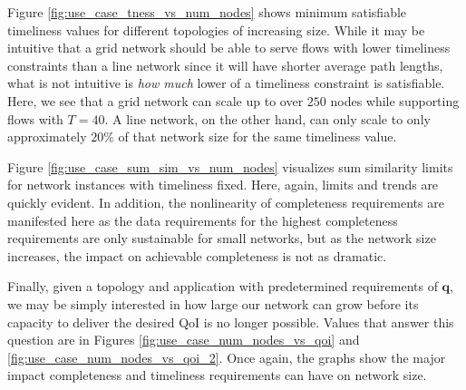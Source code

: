 Figure \ref{fig:use_case_tness_vs_num_nodes} shows minimum satisfiable timeliness values for different topologies of increasing size.  While it may be intuitive that a grid network should be able to serve flows with lower timeliness constraints than a line network since it will have shorter average path lengths, what is not intuitive is \emph{how much} lower of a timeliness constraint is satisfiable.  Here, we see that a grid network can scale up to over $250$ nodes while supporting flows with $T = 40$.  A line network, on the other hand, can only scale to only approximately $20\%$ of that network size for the same timeliness value.  %

Figure \ref{fig:use_case_sum_sim_vs_num_nodes} visualizes sum similarity limits for network instances with timeliness fixed.  Here, again, limits and trends are quickly evident.  In addition, the nonlinearity of completeness requirements are manifested here as the data requirements for the highest completeness requirements are only sustainable for small networks, but as the network size increases, the impact on achievable completeness is not as dramatic.  


Finally, given a topology and application with predetermined requirements of $\mathbf{q}$, we may be simply interested in how large our network can grow before its capacity to deliver the desired QoI is no longer possible.  Values that answer this question are in Figures \ref{fig:use_case_num_nodes_vs_qoi} and \ref{fig:use_case_num_nodes_vs_qoi_2}.  Once again, the graphs show the major impact completeness and timeliness requirements can have on network size.


